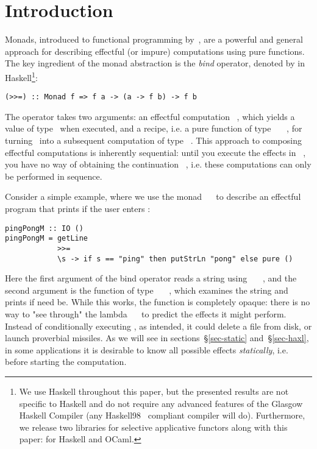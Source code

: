 \section{Introduction}\label{sec-intro}


Monads, introduced to functional programming by~\citet{1995_wadler_monads}, are
a powerful and general approach for describing effectful (or impure)
computations using pure functions. The key ingredient of the monad abstraction
is the \emph{bind} operator, denoted by \hs{>>=} in
Haskell\footnote{We use Haskell throughout this paper, but the presented results
are not specific to Haskell and do not require any advanced features of the
Glasgow Haskell Compiler (any Haskell98~\citep{haskell98} compliant compiler
will do). Furthermore, we release two libraries for selective applicative
functors along with this paper: for Haskell and OCaml.}:

\vspace{1mm}
\begin{verbatim}
(>>=) :: Monad f => f a -> (a -> f b) -> f b
\end{verbatim}
\vspace{1mm}

\noindent
The operator takes two arguments: an effectful computation ~, which
yields a value of type~ when executed, and a recipe, i.e. a pure function
of type ~\hs{->}~~, for turning~ into a subsequent
computation of type ~. This approach to composing effectful
computations is inherently sequential: until you execute the effects in
~, you have no way of obtaining the continuation ~,
i.e. these computations can only be performed in sequence.

Consider a simple example, where we use the monad ~\hs{=}~ to
describe an effectful program that prints  if the user enters
:

\vspace{1mm}
\begin{verbatim}
pingPongM :: IO ()
pingPongM = getLine
            >>=
            \s -> if s == "ping" then putStrLn "pong" else pure ()
\end{verbatim}
\vspace{1mm}

\noindent
Here the first argument of the bind operator reads a string using
~\hs{::}~~, and the second argument is the
function of type ~\hs{->}~~\hs{()}, which examines the string
and prints  if need be. While this works, the function is completely
opaque: there is no way to "see through" the lambda \hs{\s}~\hs{->}~ to
predict the effects it might perform. Instead of conditionally executing
, as intended, it could delete a file from disk, or launch
proverbial missiles. As we will see in sections~\S\ref{sec-static}
and~\S\ref{sec-haxl}, in some applications it is desirable to know all possible
effects \emph{statically}, i.e. before starting the computation.

